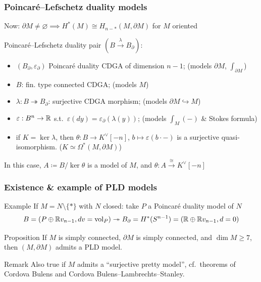 \documentclass{beamer}
\begin{document}
\begin{frame}
  \frametitle{Poincaré--Lefschetz duality models}
  Now: $\partial M \neq \varnothing \implies H^{*}(M) \cong H_{n-*}(M, \partial M)$ for $M$ oriented

  \pause \alert{Poincaré--Lefschetz duality pair} $(B \xrightarrow{\lambda} B_{\partial})$:
  \begin{itemize}[<+->]
  \item $(B_{\partial}, \varepsilon_{\partial})$ Poincaré duality CDGA of dimension $n-1$; {\tiny \hfill (models $\partial M$, $\int_{\partial M}$)}
  \item $B$: fin. type connected CDGA; {\tiny \hfill (models $M$)}
  \item $\lambda : B \twoheadrightarrow B_{\partial}$: surjective CDGA morphism; {\tiny \hfill (models $\partial M \hookrightarrow M$)}
  \item $\varepsilon : B^{n} \to \mathbb{R}$ s.t.\ $\varepsilon(dy) = \varepsilon_{\partial}(\lambda(y))$; {\tiny \hfill (models $\int_{M}(-)$ \& Stokes formula)}
  \item if $K = \ker \lambda$, then $\theta : B \to K^{\vee}[-n]$, $b \mapsto \varepsilon(b \cdot -)$ is a surjective quasi-isomorphism. {\tiny \hfill ($K \simeq \Omega^{*}(M, \partial M)$)}
  \end{itemize}

  \pause[\thebeamerpauses]
  In this case, $A \coloneqq B / \ker \theta$ is a model of $M$, and $\theta : A \xrightarrow{\cong} K^{\vee}[-n]$
\end{frame}
\begin{frame}
  \frametitle{Existence \& example of PLD models}
  \begin{exampleblock}{Example}
    If $M = N \setminus \{ * \}$ with $N$ closed:
    \pause
    take $P$ a Poincaré duality model of $N$
    \[ B = (P \oplus \mathbb{R} v_{n-1}, d v = \mathrm{vol}_{P}) \twoheadrightarrow B_{\partial} = H^{*}(S^{n-1}) = (\mathbb{R} \oplus \mathbb{R} v_{n-1}, d = 0) \]
  \end{exampleblock}

  \pause
  \begin{block}{Proposition}
    If $M$ is simply connected, $\partial M$ is simply connected, and $\dim M \geq 7$, then $(M, \partial M)$ admits a PLD model.
  \end{block}

  \pause
  \begin{block}{Remark}
    Also true if $M$ admits a ``surjective pretty model'', cf.\ theorems of Cordova Bulens and Cordova Bulens--Lambrechts--Stanley.
  \end{block}
\end{frame}
\end{document}
